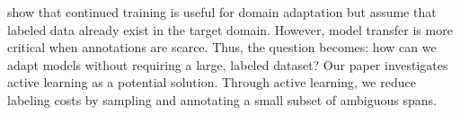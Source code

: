 \citet{xia-2021} show that continued training is useful for domain adaptation
but assume that labeled data already exist in the target
domain.
However, model transfer is more critical when annotations are scarce.
Thus, the question becomes: how can we adapt \coref{} models without requiring a
large, labeled dataset?
Our paper investigates active learning as a potential solution.  Through active learning, we reduce labeling costs by sampling and annotating a small subset of ambiguous spans.


